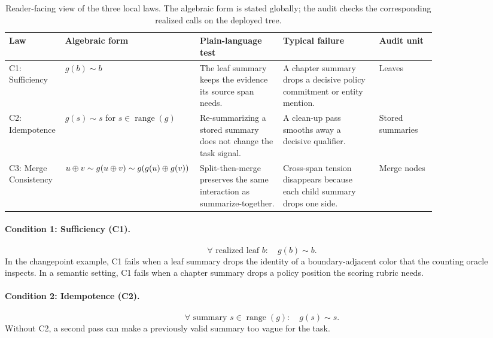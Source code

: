 \begin{table}[htbp]
\centering\footnotesize
\setlength{\tabcolsep}{3pt}
\begin{tabular}{p{0.11\linewidth}p{0.18\linewidth}p{0.19\linewidth}p{0.22\linewidth}p{0.13\linewidth}}
\toprule
Law & Algebraic form & Plain-language test & Typical failure & Audit unit \\
\midrule
C1: Sufficiency & $g(b)\sim b$ & The leaf summary keeps the evidence its source span needs. & A chapter summary drops a decisive policy commitment or entity mention. & Leaves \\
C2: Idempotence & $g(s)\sim s$ for $s \in \operatorname{range}(g)$ & Re-summarizing a stored summary does not change the task signal. & A clean-up pass smooths away a decisive qualifier. & Stored summaries \\
C3: Merge Consistency & $u \oplus v \sim g(u \oplus v) \sim g(g(u)\oplus g(v))$ & Split-then-merge preserves the same interaction as summarize-together. & Cross-span tension disappears because each child summary drops one side. & Merge nodes \\
\bottomrule
\end{tabular}
\caption{Reader-facing view of the three local laws. The algebraic form is stated globally; the audit checks the corresponding realized calls on the deployed tree.}
\label{tab:law-cards}
\end{table}

\paragraph{Condition 1: Sufficiency (C1).}
\begin{equation}\tag{C1}\label{eq:leaf_sufficiency}
\forall \text{ realized leaf } b:\quad g(b) \sim b.
\end{equation}
In the changepoint example, C1 fails when a leaf summary drops the identity of a boundary-adjacent color that the counting oracle inspects. In a semantic setting, C1 fails when a chapter summary drops a policy position the scoring rubric needs.

\paragraph{Condition 2: Idempotence (C2).}
\begin{equation}\tag{C2}\label{eq:leaf_idempotence}
\forall \text{ summary } s \in \operatorname{range}(g):\quad g(s) \sim s.
\end{equation}
Without C2, a second pass can make a previously valid summary too vague for the task.

